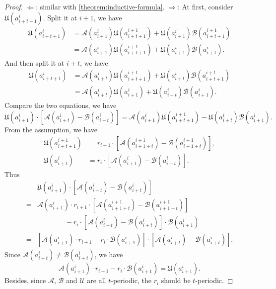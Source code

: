\begin{proof}
    $\Longleftarrow$: similar with \cref{theorem:inductive-formula}. \newline
    $\Longrightarrow$: At first, consider $\mathfrak{U}(a_{i+t+1}^{i})$. Split it at $i+1$, we have
    \begin{align*}
        \mathfrak{U}(a_{i+t+1}^{i}) &= \mathcal{A}(a_{i+1}^{i})\mathfrak{U}(a_{i+t+1}^{i+1}) + \mathfrak{U}(a_{i+1}^{i})\mathcal{B}(a_{i+t+1}^{i+1}) \\
        &= \mathcal{A}(a_{i+1}^{i})\mathfrak{U}(a_{i+t+1}^{i+1}) + \mathfrak{U}(a_{i+1}^{i})\mathcal{B}(a_{i+t}^{i}).
    \end{align*}
    And then split it at $i+t$, we have
    \begin{align*}
        \mathfrak{U}(a_{i+t+1}^{i}) &= \mathcal{A}(a_{i+t}^{i})\mathfrak{U}(a_{i+t+1}^{i+t}) + \mathfrak{U}(a_{i+t}^{i})\mathcal{B}(a_{i+t+1}^{i+t}) \\
        &= \mathcal{A}(a_{i+t}^{i})\mathfrak{U}(a_{i+1}^{i}) + \mathfrak{U}(a_{i+t}^{i})\mathcal{B}(a_{i+1}^{i}).
    \end{align*}
    Compare the two equations, we have
    \[ \mathfrak{U}(a_{i+1}^{i})\cdot\left[\mathcal{A}(a_{i+t}^{i}) - \mathcal{B}(a_{i+t}^{i})\right] = \mathcal{A}(a_{i+1}^{i})\mathfrak{U}(a_{i+t+1}^{i+1}) - \mathfrak{U}(a_{i+t}^{i})\mathcal{B}(a_{i+1}^{i}). \]
    From the assumption, we have
    \begin{align*}
        \mathfrak{U}(a_{i+t+1}^{i+1}) &= r_{i+1}\cdot \left[\mathcal{A}(a_{i+1+t}^{i+1}) - \mathcal{B}(a_{i+1+t}^{i+1})\right], \\
        \mathfrak{U}(a_{i+t}^{i}) &= r_i\cdot \left[\mathcal{A}(a_{i+t}^{i}) - \mathcal{B}(a_{i+t}^{i})\right].
    \end{align*}
    Thus
    \begin{align*}
        &\mathfrak{U}(a_{i+1}^{i})\cdot\left[\mathcal{A}(a_{i+t}^{i}) - \mathcal{B}(a_{i+t}^{i})\right] \\
        =&\mathcal{A}(a_{i+1}^{i})\cdot r_{i+1}\cdot \left[\mathcal{A}(a_{i+1+t}^{i+1}) - \mathcal{B}(a_{i+1+t}^{i+1})\right] \\
        &\quad\quad\quad\quad- r_i\cdot \left[\mathcal{A}(a_{i+t}^{i}) - \mathcal{B}(a_{i+t}^{i})\right]\cdot\mathcal{B}(a_{i+1}^{i})\\
        =&\left[\mathcal{A}(a_{i+1}^{i})\cdot r_{i+1} - r_i\cdot\mathcal{B}(a_{i+1}^{i})\right]\cdot\left[\mathcal{A}(a_{i+t}^{i}) - \mathcal{B}(a_{i+t}^{i})\right].
    \end{align*}
    Since $\mathcal{A}(a_{i+t}^{i}) \ne \mathcal{B}(a_{i+t}^{i})$, we have
    \[ \mathcal{A}(a_{i+1}^{i})\cdot r_{i+1} - r_i\cdot\mathcal{B}(a_{i+1}^{i}) = \mathfrak{U}(a_{i+1}^{i}). \]
    Besides, since $\mathcal{A}$, $\mathcal{B}$ and $\mathcal{U}$ are all $t$-periodic, the $r_{i}$ should be $t$-periodic.
\end{proof}
